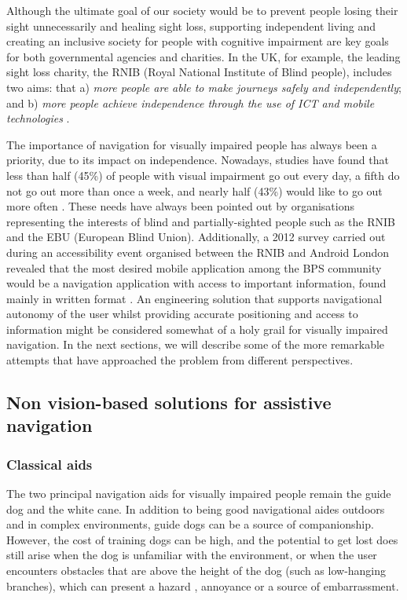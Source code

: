 Although the ultimate goal of our society would be to prevent people losing their sight unnecessarily and healing sight loss, supporting independent living and creating an inclusive society for people with cognitive impairment are key goals for both governmental agencies and charities. In the UK, for example, the leading sight loss charity, the RNIB (Royal National Institute of Blind people), includes two aims: that a) \textit{more people are able to make journeys safely and independently}; and b) \textit{more people achieve independence through the use of ICT and mobile technologies} \citep{RNIB2009}.

The importance of navigation for visually impaired people has always been a priority, due to its impact on independence. Nowadays, studies have found that less than half (45\%) of people with visual impairment go out every day, a fifth do not go out more than once a week, and nearly half (43\%) would like to go out more often \citep{douglas2006network}.  These needs have always been pointed out by organisations representing the interests of blind and partially-sighted people such as the RNIB and the EBU (European Blind Union). Additionally, a 2012 survey carried out during an accessibility event organised between the RNIB and Android London revealed that the most desired mobile application among the BPS community would be a navigation application with access to important information, found mainly in written format \citep{RNIB2012}. An engineering solution that supports navigational autonomy of the user whilst providing accurate positioning and access to information might be considered somewhat of a holy grail for visually impaired navigation. In the next sections, we will describe some of the more remarkable attempts that have approached the problem from different perspectives.




\subsection{Non vision-based solutions for assistive navigation}

\subsubsection{Classical aids}

The two principal navigation aids for visually impaired people remain the guide dog and the white cane.  In addition to being good navigational aides outdoors and in complex environments, guide dogs can be a source of companionship. However, the cost of training dogs can be high, and the potential to get lost does still arise when the dog is unfamiliar with the environment, or when the user encounters obstacles that are above the height of the dog (such as low-hanging branches), which can present a hazard \citep{manduchi2011mobility}, annoyance or a source of embarrassment. 

